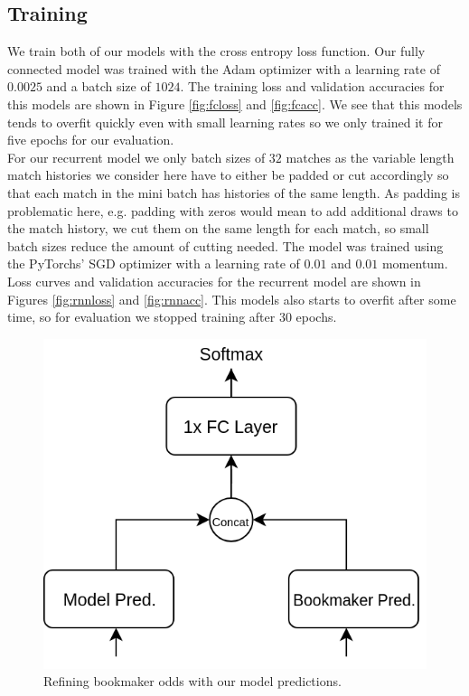 \documentclass[a4paper]{article}
\begin{document}
\subsection{Training}
We train both of our models with the cross entropy loss function. Our fully
connected model was trained with the Adam \cite{Adam} optimizer with a learning
rate of $0.0025$ and a batch size of $1024$. The training loss and validation
accuracies for this models are shown in Figure \ref{fig:fcloss} and
\ref{fig:fcacc}. We see that this models tends to overfit quickly even with
small learning rates so we only trained it for five epochs for our evaluation.
\\
For our recurrent model we only batch sizes of $32$ matches as the variable
length match histories we consider here have to either be padded or cut
accordingly so that each match in the mini batch has histories of the same
length. As padding is problematic here, e.g. padding with zeros would mean to
add additional draws to the match history, we cut them on the same length for
each match, so small batch sizes reduce the amount of cutting needed. The model
was trained using the PyTorchs' SGD optimizer with a learning rate of $0.01$ and
$0.01$ momentum. Loss curves and validation accuracies for the recurrent model
are shown in Figures \ref{fig:rnnloss} and \ref{fig:rnnacc}. This models also
starts to overfit after some time, so for evaluation we stopped training after
30 epochs.

\begin{figure} 
\includegraphics[scale=0.28]{img/Siamese3.png}
\caption{Refining bookmaker odds with our model predictions.}
\label{fig:oddsref}
\end{figure}
\end{document}
